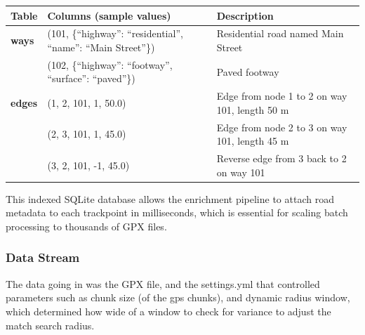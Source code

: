 \documentclass[11pt,twoside]{report}
\begin{document}
\begin{table}[htbp!]
	\centering
	\renewcommand{\arraystretch}{1.2} %
	\begin{tabularx}{\textwidth}{lXl}
		\toprule
		\textbf{Table}                                                     & \textbf{Columns (sample values)}                            & \textbf{Description} \\
		\midrule
		\textbf{ways}                                                      &
		(101, \{``highway'': ``residential'', ``name'': ``Main Street''\}) &
		Residential road named Main Street                                                                                                                      \\
		                                                                   & (102, \{``highway'': ``footway'', ``surface'': ``paved''\}) &
		Paved footway                                                                                                                                           \\
		\textbf{edges}                                                     &
		(1, 2, 101, 1, 50.0)                                               &
		Edge from node 1 to 2 on way 101, length 50 m                                                                                                           \\
		                                                                   & (2, 3, 101, 1, 45.0)                                        &
		Edge from node 2 to 3 on way 101, length 45 m                                                                                                           \\
		                                                                   & (3, 2, 101, -1, 45.0)                                       &
		Reverse edge from 3 back to 2 on way 101                                                                                                                \\
		\bottomrule
	\end{tabularx}
\end{table}This indexed SQLite database allows the enrichment pipeline to attach road metadata to each trackpoint in milliseconds, which is essential for scaling batch processing to thousands of GPX files.

\subsubsection{Data Stream}
The data going in was the GPX file, and the settings.yml that controlled parameters such as chunk size (of the gps chunks), and dynamic radius window, which determined how wide of a window to check for variance to adjust the match search radius.
\end{document}
